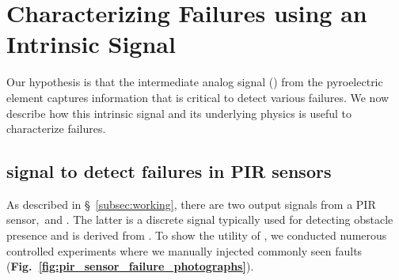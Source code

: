 \section{Characterizing Failures using an Intrinsic Signal}
\label{sec:aout_char}
Our hypothesis is that the intermediate analog signal (\aout) from the pyroelectric element captures information that is critical to detect various failures. 
%
We now describe how this intrinsic signal and its underlying physics is useful to characterize failures.

\subsection{\aout signal to detect failures in PIR sensors}
\label{subsec:controlled}
As described in \S~\ref{subsec:working}, there are two output signals from a PIR sensor,~\viz \aout and \cout. 
%
The latter is a discrete signal typically used for detecting obstacle presence and is derived from \aout.
%
To show the utility of \aout, we conducted numerous controlled experiments where we manually injected commonly seen faults ({\bfseries Fig.~\ref{fig:pir_sensor_failure_photographs}}). 




